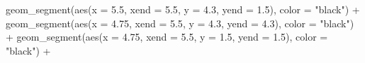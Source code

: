 \documentclass[
]{article}
\newenvironment{Shaded}{\begin{snugshade}}{\end{snugshade}}
\newcommand{\AttributeTok}[1]{\textcolor[rgb]{0.77,0.63,0.00}{#1}}
\newcommand{\FloatTok}[1]{\textcolor[rgb]{0.00,0.00,0.81}{#1}}
\newcommand{\FunctionTok}[1]{\textcolor[rgb]{0.00,0.00,0.00}{#1}}
\newcommand{\NormalTok}[1]{#1}
\newcommand{\SpecialCharTok}[1]{\textcolor[rgb]{0.00,0.00,0.00}{#1}}
\newcommand{\StringTok}[1]{\textcolor[rgb]{0.31,0.60,0.02}{#1}}
\begin{document}
\begin{Shaded}
\begin{Highlighting}[]
  \FunctionTok{geom\_segment}\NormalTok{(}\FunctionTok{aes}\NormalTok{(}\AttributeTok{x =} \FloatTok{5.5}\NormalTok{, }\AttributeTok{xend =} \FloatTok{5.5}\NormalTok{, }\AttributeTok{y =} \FloatTok{4.3}\NormalTok{, }\AttributeTok{yend =} \FloatTok{1.5}\NormalTok{), }\AttributeTok{color =} \StringTok{"black"}\NormalTok{) }\SpecialCharTok{+}
  \FunctionTok{geom\_segment}\NormalTok{(}\FunctionTok{aes}\NormalTok{(}\AttributeTok{x =} \FloatTok{4.75}\NormalTok{, }\AttributeTok{xend =} \FloatTok{5.5}\NormalTok{, }\AttributeTok{y =} \FloatTok{4.3}\NormalTok{, }\AttributeTok{yend =} \FloatTok{4.3}\NormalTok{), }\AttributeTok{color =} \StringTok{"black"}\NormalTok{) }\SpecialCharTok{+}
  \FunctionTok{geom\_segment}\NormalTok{(}\FunctionTok{aes}\NormalTok{(}\AttributeTok{x =} \FloatTok{4.75}\NormalTok{, }\AttributeTok{xend =} \FloatTok{5.5}\NormalTok{, }\AttributeTok{y =} \FloatTok{1.5}\NormalTok{, }\AttributeTok{yend =} \FloatTok{1.5}\NormalTok{), }\AttributeTok{color =} \StringTok{"black"}\NormalTok{) }\SpecialCharTok{+}
   

\end{Highlighting}
\end{Shaded}
\end{document}
